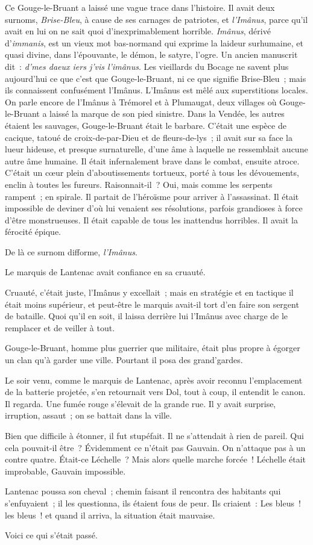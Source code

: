 \documentclass[french,twoside]{book} %
\begin{document}
Ce Gouge-le-Bruant a laissé une vague trace dans l’histoire. Il avait deux surnoms, \emph{Brise-Bleu}, à cause de ses carnages de patriotes, et \emph{l’Imânus}, parce qu’il avait en lui on ne sait quoi d’inexprimablement horrible. \emph{Imânus}, dérivé d’\emph{immanis}, est un vieux mot bas-normand qui exprime la laideur surhumaine, et quasi divine, dans l’épouvante, le démon, le satyre, l’ogre.  Un ancien manuscrit dit : \emph{d’mes daeux iers j’vis l’imânus}. Les vieillards du Bocage ne savent plus aujourd’hui ce que c’est que Gouge-le-Bruant, ni ce que signifie Brise-Bleu ; mais ils connaissent confusément l’Imânus. L’Imânus est mêlé aux superstitions locales. On parle encore de l’Imânus à Trémorel et à Plumaugat, deux villages où Gouge-le-Bruant a laissé la marque de son pied sinistre. Dans la Vendée, les autres étaient les sauvages, Gouge-le-Bruant était le barbare. C’était une espèce de cacique, tatoué de croix-de-par-Dieu et de fleurs-de-lys ; il avait sur sa face la lueur hideuse, et presque surnaturelle, d’une âme à laquelle ne ressemblait aucune autre âme humaine. Il était infernalement brave dans le combat, ensuite atroce. C’était un cœur plein d’aboutissements tortueux, porté à tous les dévouements, enclin à toutes les fureurs. Raisonnait-il ? Oui, mais comme les serpents rampent ; en spirale. Il partait de l’héroïsme pour arriver à l’assassinat. Il était impossible de deviner d’où lui venaient ses résolutions, parfois grandioses à force d’être monstrueuses. Il était capable de tous les inattendus horribles. Il avait la férocité épique.\par
De là ce surnom difforme, \emph{l’Imânus}.\par
Le marquis de Lantenac avait confiance en sa cruauté.\par
Cruauté, c’était juste, l’Imânus y excellait ; mais en stratégie et en tactique il était moins supérieur, et peut-être le marquis avait-il tort d’en faire son sergent de bataille. Quoi qu’il en soit, il laissa derrière lui l’Imânus avec charge de le remplacer et de veiller à tout.\par
 Gouge-le-Bruant, homme plus guerrier que militaire, était plus propre à égorger un clan qu’à garder une ville. Pourtant il posa des grand’gardes.\par
Le soir venu, comme le marquis de Lantenac, après avoir reconnu l’emplacement de la batterie projetée, s’en retournait vers Dol, tout à coup, il entendit le canon. Il regarda. Une fumée rouge s’élevait de la grande rue. Il y avait surprise, irruption, assaut ; on se battait dans la ville.\par
Bien que difficile à étonner, il fut stupéfait. Il ne s’attendait à rien de pareil. Qui cela pouvait-il être ? Évidemment ce n’était pas Gauvain. On n’attaque pas à un contre quatre. Était-ce Léchelle ? Mais alors quelle marche forcée ! Léchelle était improbable, Gauvain impossible.\par
Lantenac poussa son cheval ; chemin faisant il rencontra des habitants qui s’enfuyaient ; il les questionna, ils étaient fous de peur. Ils criaient : Les bleus ! les bleus ! et quand il arriva, la situation était mauvaise.\par
Voici ce qui s’était passé.
\end{document}
